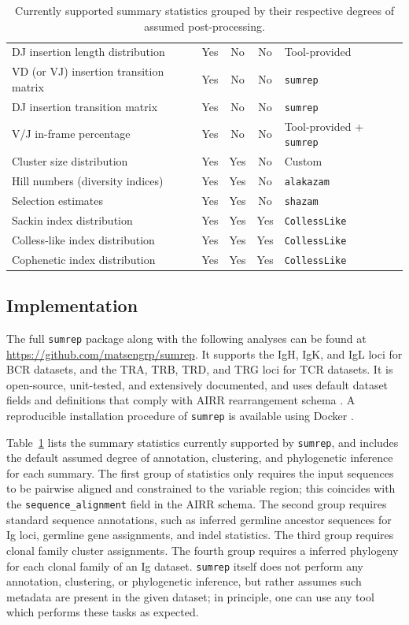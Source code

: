 \documentclass{article}
\begin{document}
\begin{table}
{\begin{tabular}{l|c|c|c|l}
DJ insertion length distribution & Yes & No & No & Tool-provided \\
VD (or VJ) insertion transition matrix & Yes & No & No & \texttt{sumrep} \\
DJ insertion transition matrix & Yes & No & No & \texttt{sumrep} \\
V/J in-frame percentage & Yes & No & No & Tool-provided + \texttt{sumrep} \\
\hline
Cluster size distribution & Yes & Yes & No & Custom \\
Hill numbers (diversity indices) & Yes & Yes & No & \texttt{alakazam} \\
Selection estimates & Yes & Yes & No & \texttt{shazam} \\
\hline
    Sackin index distribution & Yes & Yes & Yes & \texttt{CollessLike} \cite{Mir2018-lk} \\
Colless-like index distribution & Yes & Yes & Yes & \texttt{CollessLike} \\
Cophenetic index distribution & Yes & Yes & Yes & \texttt{CollessLike} \\
\end{tabular}
}
\caption{Currently supported summary statistics grouped by their respective degrees of assumed post-processing.}
\label{tab:SummaryStatistics}
\end{table}

\subsection*{Implementation}
The full \texttt{sumrep} package along with the following analyses can be found at \url{https://github.com/matsengrp/sumrep}.
It supports the IgH, IgK, and IgL loci for BCR datasets, and the TRA, TRB, TRD, and TRG loci for TCR datasets.
It is open-source, unit-tested, and extensively documented, and uses default dataset fields and definitions that comply with AIRR rearrangement schema \cite{Vander_Heiden2018-mu}.
A reproducible installation procedure of \texttt{sumrep} is available using Docker \cite{Boettiger2015-ya}.

Table~\ref{tab:SummaryStatistics} lists the summary statistics currently supported by \texttt{sumrep}, and includes the default assumed degree of annotation, clustering, and phylogenetic inference for each summary.
The first group of statistics only requires the input sequences to be pairwise aligned and constrained to the variable region; this coincides with the \texttt{sequence\_alignment} field in the AIRR schema.
The second group requires standard sequence annotations, such as inferred germline ancestor sequences for Ig loci, germline gene assignments, and indel statistics.
The third group requires clonal family cluster assignments.
The fourth group requires a inferred phylogeny for each clonal family of an Ig dataset.
\texttt{sumrep} itself does not perform any annotation, clustering, or phylogenetic inference, but rather assumes such metadata are present in the given dataset; in principle, one can use any tool which performs these tasks as expected.
\end{document}
